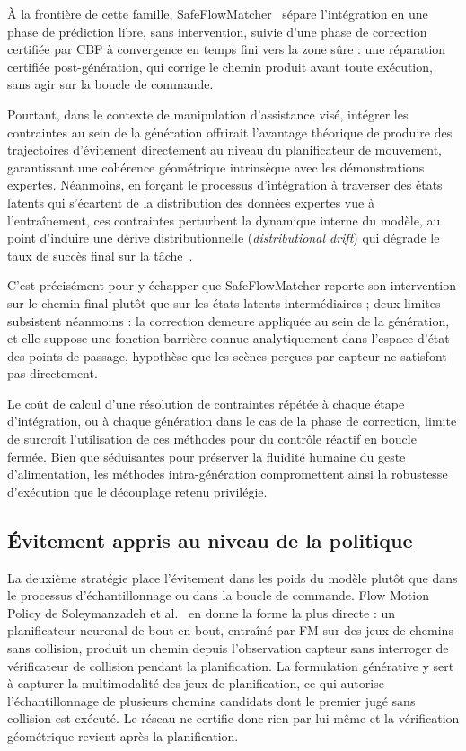 À la frontière de cette famille, SafeFlowMatcher~\cite{Yang2026Safeflowmatcher} sépare l'intégration en une phase de prédiction libre, sans intervention, suivie d'une phase de correction certifiée par \ac{CBF} à convergence en temps fini vers la zone sûre : une réparation certifiée post-génération, qui corrige le chemin produit avant toute exécution, sans agir sur la boucle de commande.

Pourtant, dans le contexte de manipulation d'assistance visé, intégrer les contraintes au sein de la génération offrirait l'avantage théorique de produire des trajectoires d'évitement directement au niveau du planificateur de mouvement, garantissant une cohérence géométrique intrinsèque avec les démonstrations expertes. Néanmoins, en forçant le processus d'intégration à traverser des états latents qui s'écartent de la distribution des données expertes vue à l'entraînement, ces contraintes perturbent la dynamique interne du modèle, au point d'induire une dérive distributionnelle (\textit{distributional drift}) qui dégrade le taux de succès final sur la tâche~\cite{Rmer2026From}.

C'est précisément pour y échapper que SafeFlowMatcher reporte son intervention sur le chemin final plutôt que sur les états latents intermédiaires ; deux limites subsistent néanmoins : la correction demeure appliquée au sein de la génération, et elle suppose une fonction barrière connue analytiquement dans l'espace d'état des points de passage, hypothèse que les scènes perçues par capteur ne satisfont pas directement.

Le coût de calcul d'une résolution de contraintes répétée à chaque étape d'intégration, ou à chaque génération dans le cas de la phase de correction, limite de surcroît l'utilisation de ces méthodes pour du contrôle réactif en boucle fermée. Bien que séduisantes pour préserver la fluidité humaine du geste d'alimentation, les méthodes intra-génération compromettent ainsi la robustesse d'exécution que le découplage retenu privilégie.

\subsection{Évitement appris au niveau de la politique}
La deuxième stratégie place l'évitement dans les poids du modèle plutôt que dans le processus d'échantillonnage ou dans la boucle de commande. Flow Motion Policy de Soleymanzadeh et al.~\cite{Soleymanzadeh2026Flow} en donne la forme la plus directe : un planificateur neuronal de bout en bout, entraîné par \ac{FM} sur des jeux de chemins sans collision, produit un chemin depuis l'observation capteur sans interroger de vérificateur de collision pendant la planification. La formulation générative y sert à capturer la multimodalité des jeux de planification, ce qui autorise l'échantillonnage de plusieurs chemins candidats dont le premier jugé sans collision est exécuté. Le réseau ne certifie donc rien par lui-même et la vérification géométrique revient après la planification.

